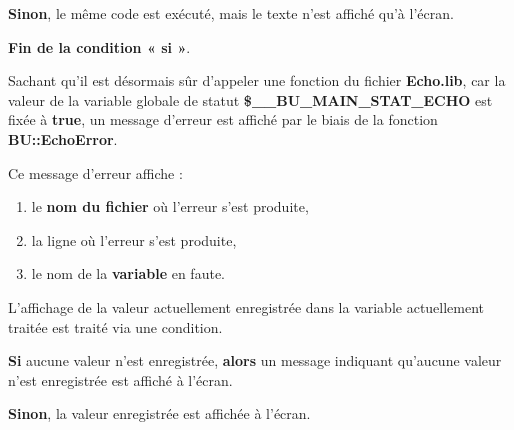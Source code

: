 \documentclass[a4paper,10pt]{article}
\begin{document}
\setlength{\parskip}{1em}

\begin{justify}
    \textbf{\color{cond}Sinon}, le même code est exécuté, mais le texte n'est affiché qu'à l'écran.
\end{justify}

\begin{justify}
    \textbf{\color{cond}Fin de la condition « si »}.
\end{justify}

\setlength{\parskip}{2em}


\begin{justify}
    Sachant qu'il est désormais sûr d'appeler une fonction du fichier \textbf{\color{path}Echo.lib}, car la valeur de la variable globale de statut \textbf{\color{vars}\$\_\_BU\_MAIN\_STAT\_ECHO} est fixée à \textbf{true}, un message d'erreur est affiché par le biais de la fonction \textbf{\color{func}BU::EchoError}.
\end{justify}

\setlength{\parskip}{1em}

\begin{justify}
    Ce message d'erreur affiche :
    \begin{enumerate}
        \item le \textbf{\color{path}nom du fichier} où l'erreur s'est produite,
        \item la ligne où l'erreur s'est produite,
        \item le nom de la \textbf{\color{vars}variable} en faute.
    \end{enumerate}
\end{justify}


\setlength{\parskip}{2em}

\begin{justify}
    L'affichage de la valeur actuellement enregistrée dans la variable actuellement traitée est traité via une condition.
\end{justify}

\setlength{\parskip}{1em}

\begin{justify}
    \textbf{\color{cond}Si} aucune valeur n'est enregistrée, \textbf{\color{cond}alors} un message indiquant qu'aucune valeur n'est enregistrée est affiché à l'écran.
\end{justify}

\begin{justify}
    \textbf{\color{cond}Sinon}, la valeur enregistrée est affichée à l'écran.
\end{justify}
\end{document}
